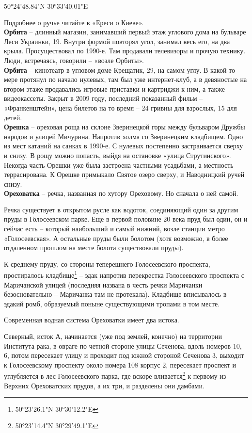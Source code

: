 50°24'48.84"N 30°33'40.01"E

Подробнее о ручье читайте в «Ереси о Киеве».\\


\textbf{Орбита} – длинный магазин, занимавший первый этаж углового дома на бульваре Леси Украинки, 19. Внутри формой повторял угол, занимал весь его, на два крыла. Просуществовал по 1990-е. Там продавали телевизоры и прочую технику. Люди, встречаясь, говорили – «возле Орбиты».\\

\textbf{Орбита} – кинотеатр в угловом доме Крещатик, 29, на самом углу. В какой-то мере протянул по начало нулевых, там был уже интернет-клуб, а в девяностые на втором этаже продавались игровые приставки и картриджи к ним, а также видеокассеты. Закрыт в 2009 году, последний показанный фильм – «Франкенштейн», цена билетов на то время – 24 гривны для взрослых, 15 для детей.\\

\textbf{Орешка} – ореховая роща на склоне Зверинецкой горы между бульваром Дружбы народов и улицей Мичурина. Напротив холма со Зверинецким кладбищем. Одно из мест катаний на санках в 1990-е. С нулевых постепенно застраивается сверху и снизу. В рощу можно попасть, выйдя на остановке «улица Струтинского». Некогда часть Орешки уже была застроена частными усадьбами, а местность террасирована. К Орешке примыкало Святое озеро сверху, и Наводницкий ручей снизу.\\

\textbf{Ореховатка} – речка, названная по хутору Ореховому. Но сначала о ней самой.

Речка существует в открытом русле как водоток, соединяющий один за другим пруды в Голосеевском парке. Еще в первой половине 20 века пруд был один, он и сейчас есть – который наибольший и самый нижний, возле станции метро «Голосеевская». А остальные пруды были болотом (хотя возможно, в более отдаленном прошлом на месте болота существовали пруды).

К среднему пруду, со стороны теперешнего Голосеевского проспекта, простиралось кладбище\footnote{50°23'26.1"N 30°30'12.2"E} – эдак напротив перекрестка Голосеевского проспекта с Маричанской улицей (последняя названа в честь речки Маричанки безосновательно – Маричанка там не протекала). Кладбище вписывалось в эдакий ромб, образуемый поныне существующими тропами в том месте.

Современная водная система Ореховатки имеет два истока.

Северный, исток А, начинается (уже под землей, конечно) на территории Института рака, в овраге по четной стороне улицы Сеченова, вдоль номеров 10, 6, потом пересекает улицу и проходит под южной стороной Сеченова 3, выходит к Голосеевскому проспекту около номера 108 корпус 2, пересекает проспект и углубляется в лес Голосеевского парка, где вскоре вливается\footnote{50°23'14.4"N 30°29'49.1"E}  к первому из Верхних Ореховатских прудов, а их три, и разделены они дамбами.

